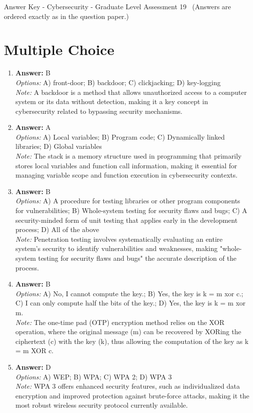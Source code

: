 \documentclass[12pt]{article}
\begin{document}
\begin{center}
Answer Key - Cybersecurity - Graduate Level Assessment 19 \
\small (Answers are ordered exactly as in the question paper.)
\end{center}

\section*{Multiple Choice}
\begin{enumerate}[label=\arabic*.]
\item \textbf{Answer:} B
\\ \textit{Options:} A) front-door; B) backdoor; C) clickjacking; D) key-logging
\\ \textit{Note:} A backdoor is a method that allows unauthorized access to a computer system or its data without detection, making it a key concept in cybersecurity related to bypassing security mechanisms.
\item \textbf{Answer:} A
\\ \textit{Options:} A) Local variables; B) Program code; C) Dynamically linked libraries; D) Global variables
\\ \textit{Note:} The stack is a memory structure used in programming that primarily stores local variables and function call information, making it essential for managing variable scope and function execution in cybersecurity contexts.
\item \textbf{Answer:} B
\\ \textit{Options:} A) A procedure for testing libraries or other program components for vulnerabilities; B) Whole-system testing for security flaws and bugs; C) A security-minded form of unit testing that applies early in the development process; D) All of the above
\\ \textit{Note:} Penetration testing involves systematically evaluating an entire system's security to identify vulnerabilities and weaknesses, making "whole-system testing for security flaws and bugs" the accurate description of the process.
\item \textbf{Answer:} B
\\ \textit{Options:} A) No, I cannot compute the key.; B) Yes, the key is k = m xor c.; C) I can only compute half the bits of the key.; D) Yes, the key is k = m xor m.
\\ \textit{Note:} The one-time pad (OTP) encryption method relies on the XOR operation, where the original message (m) can be recovered by XORing the ciphertext (c) with the key (k), thus allowing the computation of the key as k = m XOR c.
\item \textbf{Answer:} D
\\ \textit{Options:} A) WEP; B) WPA; C) WPA 2; D) WPA 3
\\ \textit{Note:} WPA 3 offers enhanced security features, such as individualized data encryption and improved protection against brute-force attacks, making it the most robust wireless security protocol currently available.
\end{enumerate}
\end{document}
